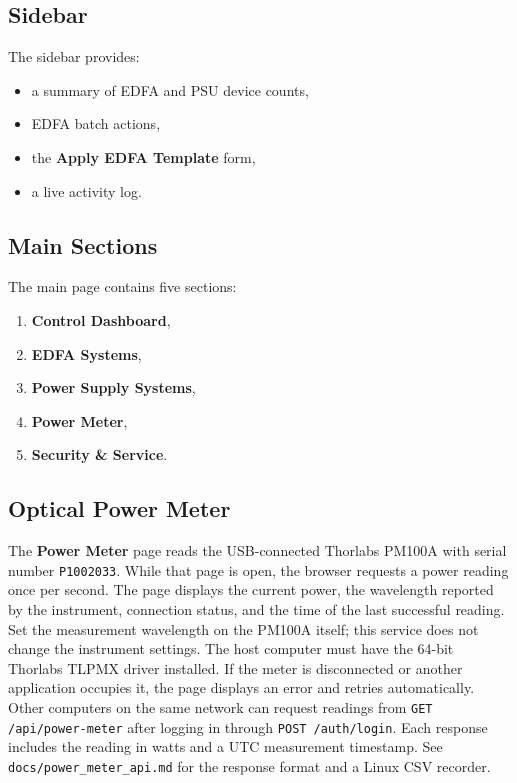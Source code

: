 \documentclass[11pt,a4paper]{article}
\begin{document}
\subsection{Sidebar}
The sidebar provides:
\begin{itemize}[leftmargin=1.5em]
    \item a summary of EDFA and PSU device counts,
    \item EDFA batch actions,
    \item the \textbf{Apply EDFA Template} form,
    \item a live activity log.
\end{itemize}

\subsection{Main Sections}
The main page contains five sections:
\begin{enumerate}[leftmargin=1.5em]
    \item \textbf{Control Dashboard},
    \item \textbf{EDFA Systems},
    \item \textbf{Power Supply Systems},
    \item \textbf{Power Meter},
    \item \textbf{Security \& Service}.
\end{enumerate}

\subsection{Optical Power Meter}
The \textbf{Power Meter} page reads the USB-connected Thorlabs PM100A with serial number
\texttt{P1002033}. While that page is open, the browser requests a power reading once per second.
The page displays the current power, the wavelength reported by the instrument, connection
status, and the time of the last successful reading. Set the measurement wavelength on the
PM100A itself; this service does not change the instrument settings. The host computer must
have the 64-bit Thorlabs TLPMX driver installed. If the meter is disconnected or another
application occupies it, the page displays an error and retries automatically.
Other computers on the same network can request readings from
\texttt{GET /api/power-meter} after logging in through \texttt{POST /auth/login}.
Each response includes the reading in watts and a UTC measurement timestamp.
See \texttt{docs/power\_meter\_api.md} for the response format and a Linux CSV recorder.
\end{document}

